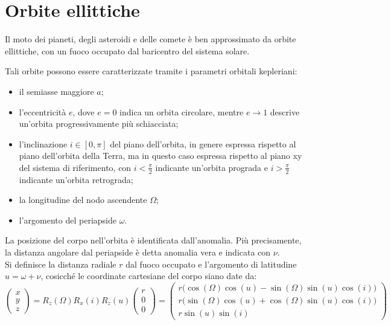 \documentclass[12pt,a4paper,openright,twoside]{book}
\begin{document}
\section{Orbite ellittiche}\label{sec:orbits}

Il moto dei pianeti, degli asteroidi e delle comete è ben approssimato da orbite ellittiche, con un fuoco occupato dal baricentro del sistema solare. \pagebreak

Tali orbite possono essere caratterizzate tramite i parametri orbitali kepleriani:
\begin{itemize}
\item il semiasse maggiore $a$;
\item l'eccentricità $e$, dove $e=0$ indica un orbita circolare, mentre $e\to 1$ descrive un'orbita progressivamente più schiacciata;
\item l'inclinazione $i\in[0,\pi]$ del piano dell'orbita, in genere espressa rispetto al piano dell'orbita della Terra, ma in questo caso espressa rispetto al piano xy del sistema di riferimento, con $i<\frac{\pi}{2}$ indicante un'orbita prograda e $i>\frac{\pi}{2}$ indicante un'orbita retrograda;
\item la longitudine del nodo ascendente $\Omega$;
\item l'argomento del periapside $\omega$.
\end{itemize}
La posizione del corpo nell'orbita è identificata dall'anomalia. Più precisamente, la distanza angolare dal periapside è detta anomalia vera e indicata con $\nu$. \\
Si definisce la distanza radiale $r$ dal fuoco occupato e l'argomento di latitudine $u=\omega+\nu$, cosicché le coordinate cartesiane del corpo siano date da:
\begin{equation}\label{eq:orbit2pos}
\begin{pmatrix}x \\ y \\ z\end{pmatrix}=R_z(\Omega)R_x(i)R_z(u)\begin{pmatrix}r \\ 0 \\ 0\end{pmatrix}=\begin{pmatrix}r\bigl(\cos(\Omega)\cos(u)-\sin(\Omega)\sin(u)\cos(i)\bigr) \\ r\bigl(\sin(\Omega)\cos(u)+\cos(\Omega)\sin(u)\cos(i)\bigr) \\ r\sin(u)\sin(i)\end{pmatrix}
\end{equation}
\end{document}
